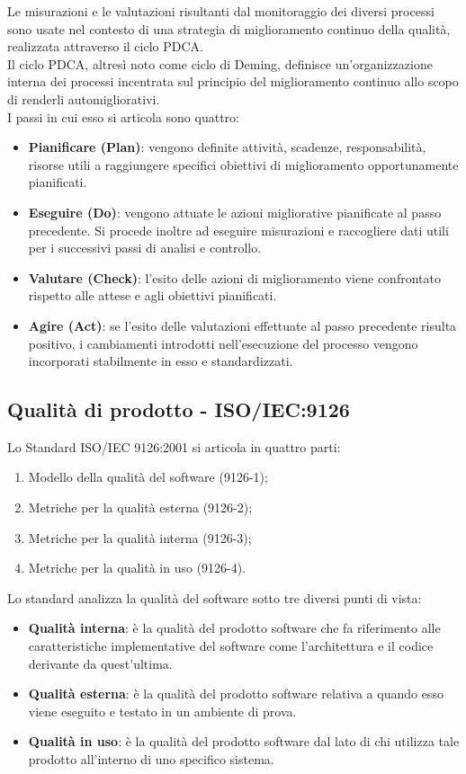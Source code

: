 Le misurazioni e le valutazioni risultanti dal monitoraggio dei diversi processi sono usate nel contesto di una strategia di miglioramento continuo della qualità, realizzata attraverso il ciclo PDCA.
\\Il ciclo PDCA, altresì noto come ciclo di Deming, definisce un'organizzazione interna dei processi incentrata sul principio del miglioramento continuo allo scopo di renderli automigliorativi.
\\I passi in cui esso si articola sono quattro:
	\begin{itemize}
		\item \textbf{Pianificare (Plan)}: vengono definite attività, scadenze, responsabilità, risorse utili a raggiungere specifici obiettivi di miglioramento opportunamente pianificati.
		\item \textbf{Eseguire (Do)}: vengono attuate le azioni migliorative pianificate al passo precedente. Si procede inoltre ad eseguire misurazioni e raccogliere dati utili per i successivi passi di analisi e controllo.
		\item \textbf{Valutare (Check)}: l'esito delle azioni di miglioramento viene confrontato rispetto alle attese e agli obiettivi pianificati.
		\item \textbf{Agire (Act)}: se l'esito delle valutazioni effettuate al passo precedente risulta positivo, i cambiamenti introdotti nell'esecuzione del processo vengono incorporati stabilmente in esso e standardizzati.
	\end{itemize}
	\subsection{Qualità di prodotto - ISO/IEC:9126}
	Lo Standard ISO/IEC 9126:2001 si articola in quattro parti:
	\begin{enumerate}
		\item Modello della qualità del software (9126-1);
		\item Metriche per la qualità esterna (9126-2);
		\item Metriche per la qualità interna (9126-3);
		\item Metriche per la qualità in uso (9126-4).
	\end{enumerate}
	Lo standard analizza la qualità del software sotto tre diversi punti di vista:
	\begin{itemize}
		\item \textbf{Qualità interna}: è la qualità del prodotto software che fa riferimento alle caratteristiche implementative del software come l'architettura e il codice derivante da quest'ultima.
		\item \textbf{Qualità esterna}: è la qualità del prodotto software relativa a quando esso viene eseguito e testato in un ambiente di prova. 
		\item \textbf{Qualità in uso}: è la qualità del prodotto software dal lato di chi utilizza tale prodotto all'interno di uno specifico sistema.
	\end{itemize}
